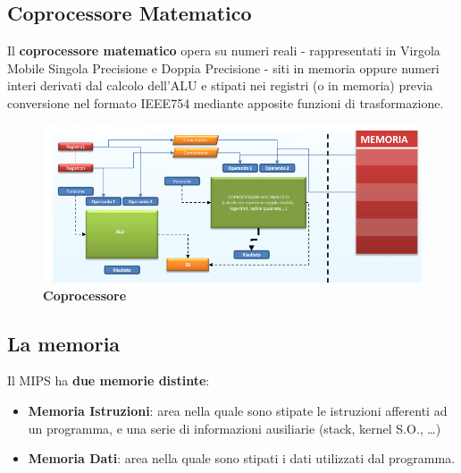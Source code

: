 \documentclass[12pt]{article}
\begin{document}
\subsection{Coprocessore Matematico}
Il \textbf{coprocessore matematico} opera su numeri reali - rappresentati in Virgola Mobile Singola Precisione e Doppia Precisione - siti in memoria oppure numeri interi derivati dal calcolo dell’ALU e stipati nei registri (o in memoria) previa conversione nel formato IEEE754 mediante apposite funzioni di trasformazione.\par\medskip\noindent
\begin{figure}[h]
\centering
\includegraphics[width=1\linewidth]{coprocessore.png}
\caption{\textbf{Coprocessore}}
\label{fig:enter-label}
\end{figure}
\subsection{La memoria}
Il MIPS ha \textbf{due memorie distinte}:
\begin{itemize}
\item \textbf{Memoria Istruzioni}: area nella quale sono stipate le istruzioni afferenti ad un programma, e una serie di informazioni ausiliarie (stack, kernel S.O., …) 
\item \textbf{Memoria Dati}: area nella quale sono stipati i dati utilizzati dal programma.\par\medskip\noindent
\end{itemize}
\end{document}

